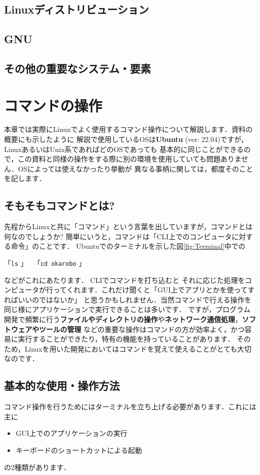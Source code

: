 \documentclass[autodetect-engine,dvi=dvipdfmx,ja=standard,a4j]{bxjsarticle}
\begin{document}
\subsection{Linuxディストリビューション}

\subsection{GNU}

\subsection{その他の重要なシステム・要素}



\section{コマンドの操作}
本章では実際にLinuxでよく使用するコマンド操作について解説します．資料の概要にも示したように
解説で使用しているOSは\textbf{Ubuntu} (ver: 22.04)ですが，LinuxあるいはUnix系であればどのOSであっても
基本的に同じことができるので，この資料と同様の操作をする際に別の環境を使用していても問題ありません．OSによっては使えなかったり挙動が
異なる事柄に関しては，都度そのことを記します．

\subsection{そもそもコマンドとは?} \label{sec:command_example}
先程からLinuxと共に「コマンド」という言葉を出していますが，コマンドとは何なのでしょうか?
簡単にいうと，コマンドは「CLI上でのコンピュータに対する命令」のことです．
Ubuntuでのターミナルを示した図\ref{fig:Terminal}中での
\begin{center}
    「\texttt{ls} 」 \ 「\texttt{cd okarobo} 」
\end{center}
などがこれにあたります．
CLIでコマンドを打ち込むと
それに応じた処理をコンピュータが行ってくれます．これだけ聞くと「GUI上でアプリとかを使ってすればいいのではないか」
と思うかもしれません．当然コマンドで行える操作を同じ様にアプリケーションで実行できることは多いです．
ですが，プログラム開発で頻繁に行う\textbf{ファイルやディレクトリの操作}や\textbf{ネットワーク通信処理}，\textbf{ソフトウェアやツールの管理}
などの重要な操作はコマンドの方が効率よく，かつ容易に実行することができたり，特有の機能を持っていることがあります．
そのため，Linuxを用いた開発においてはコマンドを覚えて使えることがとても大切なのです．


\subsection{基本的な使用・操作方法}
コマンド操作を行うためにはターミナルを立ち上げる必要があります．これには主に
\begin{itemize}
    \item GUI上でのアプリケーションの実行
    \item キーボードのショートカットによる起動
\end{itemize}
の2種類があります．
\end{document}
